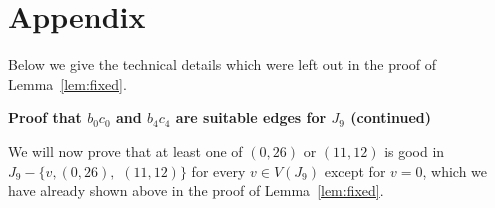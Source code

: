 \documentclass{amcjoucc}
\begin{document}


%



\newpage

\section*{Appendix}

Below we give the technical details which were left out in the proof of Lemma~\ref{lem:fixed}.

\bigskip

\noindent
\textbf{Proof that $b_0c_0$ and $b_4c_4$ are suitable edges for $J_{9}$ (continued)}

We will now prove that at least one of $(0,26)$ or $(11,12)$ is good in $J_9 - \{v,(0,26),$ $(11,12)\}$ for every $v \in V(J_9)$ except for $v = 0$, which we have already shown above in the proof of Lemma~\ref{lem:fixed}.
\end{document}
